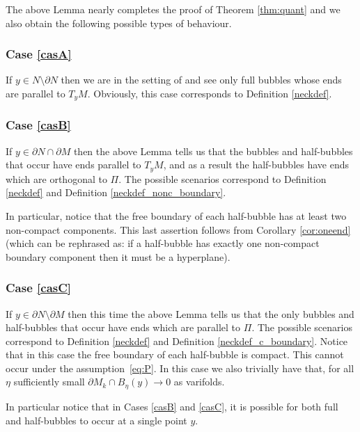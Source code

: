 \documentclass[JEP,XML,SOM,Unicode]{cedram}
\newcounter{cas}
\renewcommand{\thecas}{\Roman{cas}}
\theoremstyle{definition}
\begin{document}
The above Lemma nearly completes the proof of Theorem \ref{thm:quant} and we also obtain the following possible types of behaviour.

\renewcommand{\thecas}{\Alph{cas}}
\subsubsection*{\label{casA}Case \ref{casA}} If $y\in N\setminus \partial N$ then we are in the setting of \cite{BS17} and see only full bubbles whose ends are parallel to $T_y M$. Obviously, this case corresponds to Definition \ref{neckdef}. 

\subsubsection*{\label{casB}Case \ref{casB}} If $y\in \partial N\cap \partial M$ then the above Lemma tells us that
the bubbles and half-bubbles that occur have ends parallel to $T_y M$, and as a result the half-bubbles have ends which are orthogonal to $\Pi$. The possible scenarios correspond to Definition \ref{neckdef} and Definition \ref{neckdef_nonc_boundary}.

In particular, notice that the free boundary of each half-bubble has at least two non-compact components. This last assertion follows from Corollary \ref{cor:oneend} (which can be rephrased as: if a half-bubble has exactly one non-compact boundary component then it must be a hyperplane). 

\subsubsection*{\label{casC}Case \ref{casC}} If $y\in \partial N\setminus \partial M$ then this time the above Lemma tells us that the only bubbles and half-bubbles that occur have ends which are parallel to $\Pi$. The possible scenarios correspond to Definition \ref{neckdef} and Definition \ref{neckdef_c_boundary}.
Notice that in this case the free boundary of each half-bubble is compact. This cannot occur under the assump\-tion~\eqref{eq:P}. In this case we also trivially have that, for all $\eta$ sufficiently small \hbox{$\partial M_k\cap B_\eta(y) \to 0$} as varifolds. 

In particular notice that in Cases \ref{casB} and \ref{casC}, it is possible for both full and half-bubbles to occur at a single point $y$.
\end{document}
